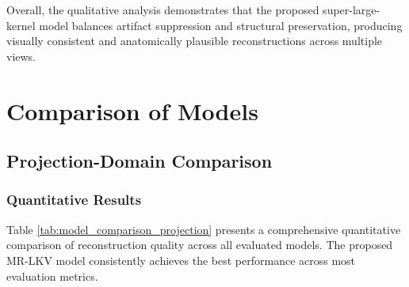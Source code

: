Overall, the qualitative analysis demonstrates that the proposed super-large-kernel model balances artifact suppression and structural preservation, producing visually consistent and anatomically plausible reconstructions across multiple views. 




\section{Comparison of Models}
\subsection{Projection-Domain Comparison}
\subsubsection{Quantitative Results}
\begin{table}[H]
\centering
\caption{Quantitative comparison of reconstruction quality across different models in the projection-domain}
\label{tab:model_comparison_projection}
\renewcommand{\arraystretch}{1.2}

\end{table}


Table \ref{tab:model_comparison_projection} presents a comprehensive quantitative comparison of reconstruction quality across all evaluated models. The proposed MR-LKV model consistently achieves the best performance across most evaluation metrics.

